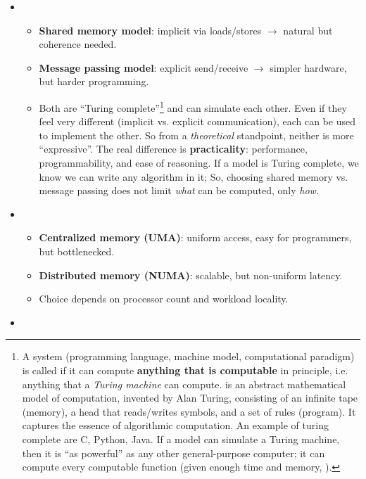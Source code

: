 \begin{itemize}
    \item {}
    \begin{itemize}
        \item \textbf{Shared memory model}: implicit via loads/stores $\rightarrow$ natural but coherence needed.
        \item \textbf{Message passing model}: explicit send/receive $\rightarrow$ simpler hardware, but harder programming.
        \item Both are ``Turing complete''\footnote{%
            A system (programming language, machine model, computational paradigm) is called  if it can compute \textbf{anything that is computable} in principle, i.e. anything that a \emph{Turing machine} can compute.  is an abstract mathematical model of computation, invented by Alan Turing, consisting of an infinite tape (memory), a head that reads/writes symbols, and a set of rules (program). It captures the essence of algorithmic computation. An example of turing complete are C, Python, Java. If a model can simulate a Turing machine, then it is ``as powerful'' as any other general-purpose computer; it can compute every computable function (given enough time and memory, ).
        } and can simulate each other. Even if they feel very different (implicit vs. explicit communication), each can be used to implement the other. So from a \emph{theoretical} standpoint, neither is more ``expressive''. The real difference is \textbf{practicality}: performance, programmability, and ease of reasoning. If a model is Turing complete, we know we can write any algorithm in it; So, choosing shared memory vs. message passing does not limit \emph{what} can be computed, only \emph{how}.
    \end{itemize}
    \item {}
    \begin{itemize}
        \item \textbf{Centralized memory (UMA)}: uniform access, easy for programmers, but bottlenecked.
        \item \textbf{Distributed memory (NUMA)}: scalable, but non-uniform latency.
        \item Choice depends on processor count and workload locality.
    \end{itemize}
    \item {}

\end{itemize}
